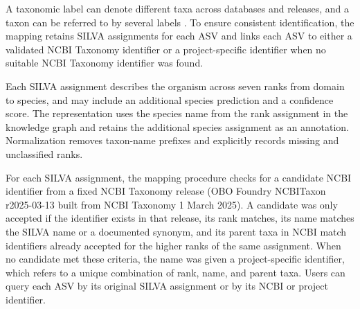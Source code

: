 \begin{revision}
A taxonomic label can denote different taxa across databases and releases, and a taxon can be referred to by several labels \cite{balvovciute2017silva}. To ensure consistent identification, the mapping retains SILVA assignments for each ASV and links each ASV to either a validated NCBI Taxonomy identifier or a project-specific identifier when no suitable NCBI Taxonomy identifier was found.

Each SILVA assignment describes the organism across seven ranks from domain to species, and may include an additional species prediction and a confidence score. The representation uses the species name from the rank assignment in the knowledge graph and retains the additional species assignment as an annotation. Normalization removes taxon-name prefixes and explicitly records missing and unclassified ranks.

For each SILVA assignment, the mapping procedure checks for a candidate NCBI identifier from a fixed NCBI Taxonomy release (OBO Foundry NCBITaxon r2025-03-13 built from NCBI Taxonomy 1 March 2025). A candidate was only accepted if the identifier exists in that release, its rank matches, its name matches the SILVA name or a documented synonym, and its parent taxa in NCBI match identifiers already accepted for the higher ranks of the same assignment. When no candidate met these criteria, the name was given a project-specific identifier, which refers to a unique combination of rank, name, and parent taxa. Users can query each ASV by its original SILVA assignment or by its NCBI or project identifier.







\end{revision}
